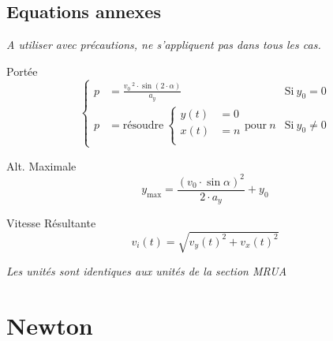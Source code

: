 \documentclass[12pt,a4paper]{article} %
\begin{document}
\subsection*{Equations annexes}
\emph{A utiliser avec précautions, ne s'appliquent pas dans tous les cas.}
\par\vspace{1em}
\begin{twocols}[0.5][0.4][t]
	Port\'ee
	\begin{equation*}
		\left\{
		\begin{array}{rll}
			p &= {\displaystyle \frac{v_0\,^2 \cdot \sin (2 \cdot \alpha)}{a_y}} & \text{Si}\:y_0 = 0 \\[1em]
			p &= \text{résoudre}\:\left\{
					\begin{aligned}
						y(t) &= 0 \\
						x(t) &= n \\
					\end{aligned}
			\right.
				\text{pour} \: n
			 & \text{Si}\:y_0 \neq 0
		\end{array}
		\right.
	\end{equation*}

\nextcol

	Alt. Maximale
	\begin{equation*}
		y_\text{max} = \frac{(v_0\cdot\sin{\alpha})^2}{2 \cdot a_y} + y_0
	\end{equation*}

	Vitesse Résultante
	\begin{equation*}
		v_i(t) = \sqrt{v_y(t)^2 + v_x(t)^2}
	\end{equation*}

\end{twocols}

\vspace{1em}
\emph{Les unités sont identiques aux unités de la section MRUA}

\newpage

\section{Newton}
\end{document}
